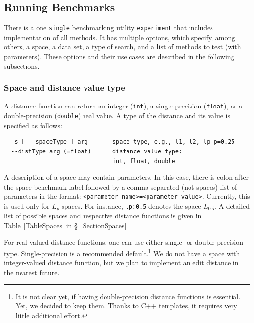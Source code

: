 \documentclass[runningheads,a4paper]{llncs}
\newcommand{\ttt}[1]{\texttt{#1}}
\begin{document}
{\subsection{Running Benchmarks}\label{SectionRunBenchmark}
There is a one \ttt{single} benchmarking utility 
\ttt{experiment} that includes implementation of all methods.
It has multiple options, which specify, among others, 
a space, a data set, a type of search, and a list of methods to test (with parameters).
These options and their use cases are described in the following subsections.

\subsubsection{Space and distance value type}

A distance function can return an integer (\ttt{int}), a single-precision (\ttt{float}),
or a double-precision (\ttt{double}) real value.
A type of the distance and its value is specified as follows:

\begin{verbatim}
  -s [ --spaceType ] arg       space type, e.g., l1, l2, lp:p=0.25
  --distType arg (=float)      distance value type: 
                               int, float, double
\end{verbatim}

A description of a space may contain parameters.
In this case, there is colon after the space benchmark label followed by a
comma-separated (not spaces) list of parameters in the format:
\ttt{<parameter name>=<parameter value>}.
Currently, this is used only for $L_p$ spaces. For instance,
 \ttt{lp:0.5} denotes the space $L_{0.5}$.
A detailed list of possible spaces and respective
distance functions is given in Table~\ref{TableSpaces} in \S~\ref{SectionSpaces}.

For real-valued distance functions, one can use either single- or double-precision
type. Single-precision is a recommended default.\footnote{It is not clear yet,
if having double-precision distance functions is essential. Yet, we decided
to keep them. Thanks to C++ templates, it requires very little additional effort.}
We do not have a space with integer-valued distance function, but we
plan to implement an edit distance in the nearest future.

}
\end{document}
